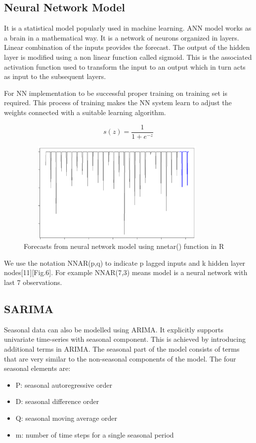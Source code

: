 \documentclass[runningheads]{llncs}
\begin{document}
\subsection{Neural Network Model}
It is a statistical model popularly used in machine learning. ANN model works as a brain in a mathematical way. It is a network of neurons organized in layers. Linear combination of the inputs provides the forecast. The output of the hidden layer is modified using a non linear function called sigmoid. This is the associated activation function used to transform the input to an output which in turn acts as input to the subsequent layers.

For NN implementation to be successful proper training on training set is required. This process of training makes the NN system learn to adjust the weights connected with a suitable learning algorithm.

\begin{equation}
s(z) = \frac{1}{1 + e^{-z}}
\end{equation}

\begin{figure}
\centering
\includegraphics[scale=1,width=10cm,height=5cm]{NNARNew.png} 
\caption{Forecasts from neural network model using nnetar() function in R}
\end{figure}

We use the notation NNAR(p,q) to indicate p lagged inputs and k hidden layer nodes[11][Fig.6]. For example NNAR(7,3) means model is a neural network with last 7 observations.

\subsection{SARIMA}
Seasonal data can also be modelled using ARIMA. It explicitly supports univariate time-series with seasonal component. This is achieved by introducing additional terms in ARIMA. The seasonal part of the model consists of terms that are very similar to the non-seasonal components of the model. The four seasonal elements are: 
\begin{itemize}
\item P: seasonal autoregressive order
\item D: seasonal difference order
\item Q: seasonal moving average order
\item m: number of time steps for a single seasonal period
\end{itemize}
\end{document}

